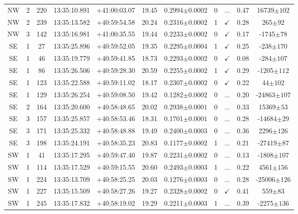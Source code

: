 \begin{landscape}
\begin{longtable}{ccccccccccc}
	NW & 2 & 220 & 13:35:10.891 & +41:00:03.07 & 19.45 & 0.2994$\pm{0.0002}$ & 0 & ... & 0.47 & 16739$\pm{102}$ \\
	NW & 2 & 239 & 13:35:13.582 & +40:59:54.58 & 20.24 & 0.2316$\pm{0.0002}$ & 1 & $\checkmark$ & 0.28 & 265$\pm{92}$ \\
	NW & 3 & 142 & 13:35:16.981 & +41:00:35.55 & 19.44 & 0.2233$\pm{0.0002}$ & 0 & $\checkmark$ & 0.17 & -1745$\pm{78}$ \\
	SE & 1 & 27 & 13:35:25.896 & +40:59:52.05 & 19.35 & 0.2295$\pm{0.0004}$ & 1 & $\checkmark$ & 0.25 & -238$\pm{170}$ \\
	SE & 1 & 46 & 13:35:19.779 & +40:59:41.85 & 18.73 & 0.2293$\pm{0.0002}$ & 0 & $\checkmark$ & 0.08 & -284$\pm{107}$ \\
	SE & 1 & 86 & 13:35:26.506 & +40:59:28.30 & 20.59 & 0.2255$\pm{0.0002}$ & 1 & $\checkmark$ & 0.29 & -1205$\pm{112}$ \\
	SE & 1 & 123 & 13:35:22.588 & +40:59:11.02 & 18.17 & 0.2307$\pm{0.0002}$ & 0 & $\checkmark$ & 0.22 & 44$\pm{102}$ \\
	SE & 1 & 129 & 13:35:26.254 & +40:59:08.50 & 19.42 & 0.1282$\pm{0.0002}$ & 0 & ... & 0.20 & -24863$\pm{107}$ \\
	SE & 2 & 164 & 13:35:20.600 & +40:58:48.65 & 20.02 & 0.2938$\pm{0.0001}$ & 0 & ... & 0.33 & 15369$\pm{53}$ \\
	SE & 3 & 157 & 13:35:25.857 & +40:58:53.46 & 18.31 & 0.1701$\pm{0.0001}$ & 0 & ... & 0.28 & -14684$\pm{29}$ \\
	SE & 3 & 171 & 13:35:25.332 & +40:58:48.88 & 19.49 & 0.2400$\pm{0.0003}$ & 0 & ... & 0.36 & 2296$\pm{126}$ \\
	SE & 3 & 198 & 13:35:24.191 & +40:58:35.23 & 20.83 & 0.1177$\pm{0.0002}$ & 1 & ... & 0.21 & -27419$\pm{87}$ \\
	SW & 1 & 41 & 13:35:17.295 & +40:59:47.40 & 19.87 & 0.2231$\pm{0.0002}$ & 0 & ... & 0.13 & -1808$\pm{107}$ \\
	SW & 1 & 114 & 13:35:17.529 & +40:59:15.55 & 20.60 & 0.2493$\pm{0.0003}$ & 1 & ... & 0.22 & 4561$\pm{156}$ \\
	SW & 1 & 224 & 13:35:13.709 & +40:58:25.25 & 20.03 & 0.1276$\pm{0.0003}$ & 0 & ... & 0.28 & -25006$\pm{126}$ \\
	SW & 1 & 227 & 13:35:15.509 & +40:58:27.26 & 19.27 & 0.2328$\pm{0.0002}$ & 0 & $\checkmark$ & 0.41 & 559$\pm{83}$ \\
	SW & 1 & 245 & 13:35:17.832 & +40:58:19.02 & 19.29 & 0.2211$\pm{0.0003}$ & 1 & ... & 0.39 & -2275$\pm{136}$ \\

\end{longtable}
\end{landscape}
